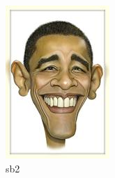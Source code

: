 \documentclass[12pt]{article}
\begin{document}
    \begin{figure}[htbp]
        \centering
        \hspace{20pt}%
        \begin{minipage}{149pt}
            \centering
            \includegraphics{obama.jpg}
            \caption{sb2}
        \end{minipage}
    \end{figure}
    
\end{document}
